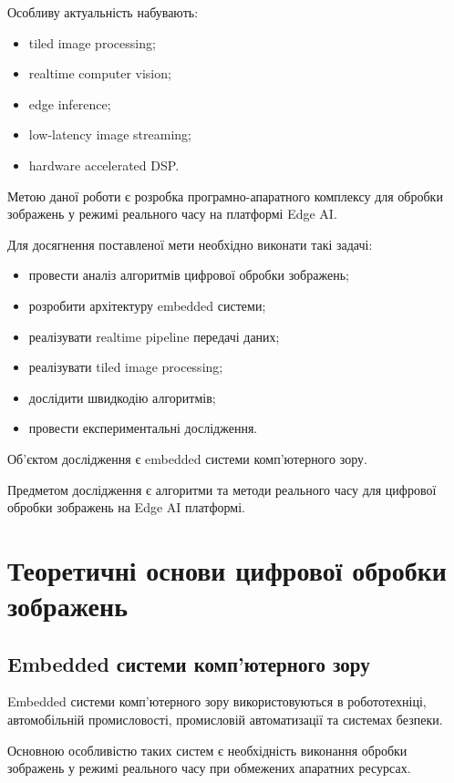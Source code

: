 \documentclass[14pt,a4paper]{extreport}
\begin{document}
Особливу актуальність набувають:
\begin{itemize}
    \item tiled image processing;
    \item realtime computer vision;
    \item edge inference;
    \item low-latency image streaming;
    \item hardware accelerated DSP.
\end{itemize}

Метою даної роботи є розробка програмно-апаратного
комплексу для обробки зображень у режимі реального часу
на платформі Edge AI.

Для досягнення поставленої мети необхідно виконати такі задачі:
\begin{itemize}
    \item провести аналіз алгоритмів цифрової обробки зображень;
    \item розробити архітектуру embedded системи;
    \item реалізувати realtime pipeline передачі даних;
    \item реалізувати tiled image processing;
    \item дослідити швидкодію алгоритмів;
    \item провести експериментальні дослідження.
\end{itemize}

Об’єктом дослідження є embedded системи комп’ютерного зору.

Предметом дослідження є алгоритми та методи
реального часу для цифрової обробки зображень
на Edge AI платформі.


\chapter{Теоретичні основи цифрової обробки зображень}

\section{Embedded системи комп’ютерного зору}

Embedded системи комп’ютерного зору використовуються
в робототехніці, автомобільній промисловості,
промисловій автоматизації та системах безпеки.

Основною особливістю таких систем є необхідність
виконання обробки зображень у режимі реального часу
при обмежених апаратних ресурсах.
\end{document}

